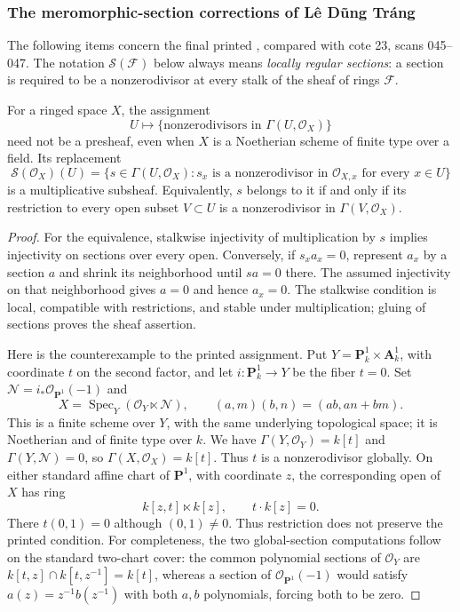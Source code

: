 \subsubsection{The meromorphic-section corrections of L\^e D\~ung Tr\'ang}

The following items concern the final printed
\cite[IV 20.1.3--20.1.11, pp.~227--230;
21.1.5--21.1.6, pp.~256--257;
21.2.9, p.~261; 21.6.2, p.~271]{algEGAIV4},
compared with cote 23, scans 045--047.  The notation
$\mathscr S(\mathcal F)$ below always means \emph{locally regular
sections}: a section is required to be a nonzerodivisor at every
stalk of the sheaf of rings $\mathcal F$.

\begin{proposition}\label{SA23-D-12}
For a ringed space $X$, the assignment
\[
 U\longmapsto
 \{\text{nonzerodivisors in }\Gamma(U,\mathcal O_X)\}
\]
need not be a presheaf, even when $X$ is a Noetherian scheme
of finite type over a field.  Its replacement
\[
 \mathscr S(\mathcal O_X)(U)=
 \{s\in\Gamma(U,\mathcal O_X):
 s_x\text{ is a nonzerodivisor in }\mathcal O_{X,x}
 \text{ for every }x\in U\}
\]
is a multiplicative subsheaf.  Equivalently, $s$ belongs to it
if and only if its restriction to every open subset $V\subset U$
is a nonzerodivisor in $\Gamma(V,\mathcal O_X)$.
\end{proposition}
\begin{proof}
For the equivalence, stalkwise injectivity of multiplication by
$s$ implies injectivity on sections over every open.  Conversely,
if $s_xa_x=0$, represent $a_x$ by a section $a$ and shrink its
neighborhood until $sa=0$ there.  The assumed injectivity on
that neighborhood gives $a=0$ and hence $a_x=0$.
The stalkwise condition is local, compatible with restrictions,
and stable under multiplication; gluing of sections proves the
sheaf assertion.

Here is the counterexample to the printed assignment.  Put
$Y=\mathbf P^1_k\times\mathbf A^1_k$, with coordinate $t$
on the second factor, and let $i:\mathbf P^1_k\to Y$ be the
fiber $t=0$.  Set $\mathcal N=i_*\mathcal O_{\mathbf P^1}(-1)$
and
\[
 X=\operatorname{Spec}_Y(\mathcal O_Y\ltimes\mathcal N),
 \qquad
 (a,m)(b,n)=(ab,an+bm).
\]
This is a finite scheme over $Y$, with the same underlying
topological space; it is Noetherian and of finite type over $k$.
We have
$\Gamma(Y,\mathcal O_Y)=k[t]$ and
$\Gamma(Y,\mathcal N)=0$, so
$\Gamma(X,\mathcal O_X)=k[t]$.  Thus $t$ is a nonzerodivisor
globally.  On either standard affine chart of $\mathbf P^1$,
with coordinate $z$, the corresponding open of $X$ has ring
\[
 k[z,t]\ltimes k[z],\qquad t\cdot k[z]=0.
\]
There $t(0,1)=0$ although $(0,1)\ne0$.
Thus restriction does not preserve the printed condition.
For completeness, the two global-section computations follow
on the standard two-chart cover: the common polynomial sections
of $\mathcal O_Y$ are
$k[t,z]\cap k[t,z^{-1}]=k[t]$, whereas a section of
$\mathcal O_{\mathbf P^1}(-1)$ would satisfy
$a(z)=z^{-1}b(z^{-1})$ with both $a,b$ polynomials, forcing
both to be zero.
\end{proof}

